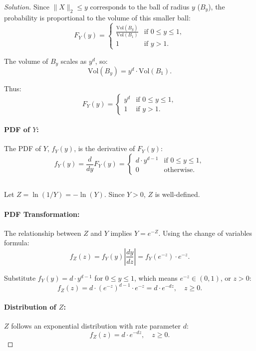 \documentclass[12pt]{article}
\newenvironment{solution}{\begin{proof}[Solution]}{\end{proof}}
\begin{document}
\begin{solution}
Since \( \|X\|_2 \leq y \) corresponds to the ball of radius \( y \) (\( B_y \)), the probability is proportional to the volume of this smaller ball:
\[
F_Y(y) = 
\begin{cases} 
\frac{\text{Vol}(B_y)}{\text{Vol}(B_1)} & \text{if } 0 \leq y \leq 1, \\
1 & \text{if } y > 1.
\end{cases}
\]

The volume of \( B_y \) scales as \( y^d \), so:
\[
\text{Vol}(B_y) = y^d \cdot \text{Vol}(B_1).
\]

Thus:
\[
F_Y(y) = 
\begin{cases} 
y^d & \text{if } 0 \leq y \leq 1, \\
1 & \text{if } y > 1.
\end{cases}
\]

\paragraph{PDF of \( Y \):}
The PDF of \( Y \), \( f_Y(y) \), is the derivative of \( F_Y(y) \):
\[
f_Y(y) = \frac{d}{dy} F_Y(y) =
\begin{cases} 
d \cdot y^{d-1} & \text{if } 0 \leq y \leq 1, \\
0 & \text{otherwise}.
\end{cases}
\]

\subsection*{}
Let \( Z = \ln(1 / Y) = -\ln(Y) \). Since \( Y > 0 \), \( Z \) is well-defined.

\paragraph{PDF Transformation:}
The relationship between \( Z \) and \( Y \) implies \( Y = e^{-Z} \). Using the change of variables formula:
\[
f_Z(z) = f_Y(y) \left| \frac{dy}{dz} \right| = f_Y(e^{-z}) \cdot e^{-z}.
\]

Substitute \( f_Y(y) = d \cdot y^{d-1} \) for \( 0 \leq y \leq 1 \), which means \( e^{-z} \in (0, 1) \), or \( z > 0 \):
\[
f_Z(z) = d \cdot (e^{-z})^{d-1} \cdot e^{-z} = d \cdot e^{-dz}, \quad z \geq 0.
\]

\paragraph{Distribution of \( Z \):}
\( Z \) follows an exponential distribution with rate parameter \( d \):
\[
f_Z(z) = d \cdot e^{-dz}, \quad z \geq 0.
\]


\end{solution}
\end{document}
